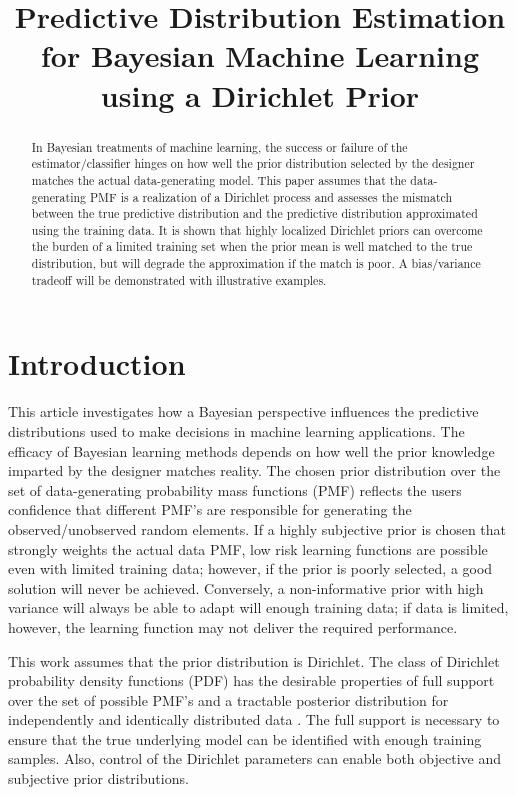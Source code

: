 \documentclass[conference]{IEEEtran}
\title{Predictive Distribution Estimation for Bayesian Machine Learning using a Dirichlet Prior}
\author{
\IEEEauthorblockN{Paul Rademacher}
\IEEEauthorblockA{U.S. Naval Research Laboratory\\Radar Division\\Washington, DC 20375, USA}
\and
\IEEEauthorblockN{Milo\v{s} Doroslova\v{c}ki}
\IEEEauthorblockA{The George Washington University\\Department of Electrical and Computer Engineering\\Washington, DC 20052, USA}
}
\begin{document}
\maketitle

\begin{abstract}
In Bayesian treatments of machine learning, the success or failure of the estimator/classifier hinges on how well the prior distribution selected by the designer matches the actual data-generating model. This paper assumes that the data-generating PMF is a realization of a Dirichlet process and assesses the mismatch between the true predictive distribution and the predictive distribution approximated using the training data. It is shown that highly localized Dirichlet priors can overcome the burden of a limited training set when the prior mean is well matched to the true distribution, but will degrade the approximation if the match is poor. A bias/variance tradeoff will be demonstrated with illustrative examples.
\end{abstract}


\section{Introduction}

This article investigates how a Bayesian perspective influences the predictive distributions used to make decisions in machine learning applications. The efficacy of Bayesian learning methods depends on how well the prior knowledge imparted by the designer matches reality. The chosen prior distribution over the set of data-generating probability mass functions (PMF) reflects the users confidence that different PMF's are responsible for generating the observed/unobserved random elements. If a highly subjective prior is chosen that strongly weights the actual data PMF, low risk learning functions are possible even with limited training data; however, if the prior is poorly selected, a good solution will never be achieved. Conversely, a non-informative prior with high variance will always be able to adapt will enough training data; if data is limited, however, the learning function may not deliver the required performance.

This work assumes that the prior distribution is Dirichlet. The class of Dirichlet probability density functions (PDF) has the desirable properties of full support over the set of possible PMF's and a tractable posterior distribution for independently and identically distributed data \cite{ferguson}. The full support is necessary to ensure that the true underlying model can be identified with enough training samples. Also, control of the Dirichlet parameters can enable both objective and subjective prior distributions. 
\end{document}
